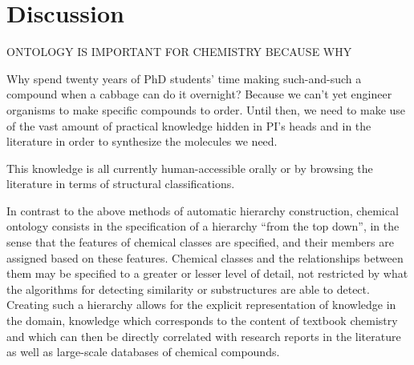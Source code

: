 \documentclass[10pt]{bmc_article}
\newenvironment{bmcformat}{\baselineskip20pt\sloppy\setboolean{publ}{false}}{\baselineskip20pt\sloppy}
\begin{document}
\begin{bmcformat}
% 



\section*{Discussion}


ONTOLOGY IS IMPORTANT FOR CHEMISTRY BECAUSE WHY

Why spend twenty years of PhD students' time making such-and-such a compound when a cabbage can do it overnight? Because we can't yet engineer organisms to make specific compounds to order. Until then, we need to make use of the vast amount of practical knowledge hidden in PI's heads and in the literature in order to synthesize the molecules we need.


This knowledge is all currently human-accessible orally or by browsing the literature in terms of structural classifications.


In contrast to the above methods of automatic hierarchy construction, chemical ontology consists in the specification of a hierarchy ``from the top down'', in the sense that the features of chemical classes are specified, and their members are assigned based on these features.  Chemical classes and the relationships between them may be specified to a greater or lesser level of detail, not restricted by what the algorithms for detecting similarity or substructures are able to detect. Creating such a hierarchy allows for the explicit representation of knowledge in the domain, knowledge which corresponds to the content of textbook chemistry and which can then be directly correlated with research reports in the literature as well as large-scale databases of chemical compounds. %


\end{bmcformat}
\end{document}
